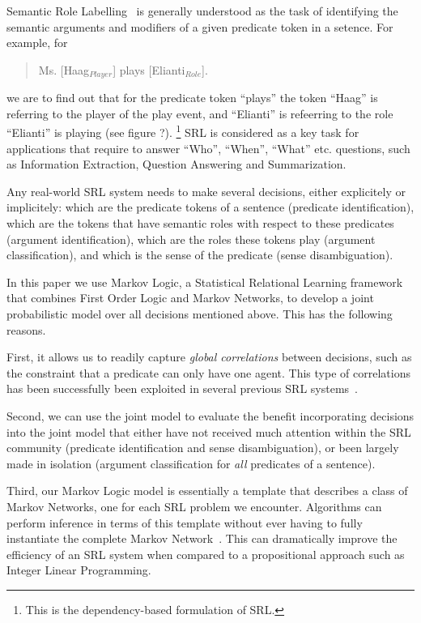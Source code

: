 
Semantic Role Labelling~\citep[SRL, ][]{carreras05introduction}
is generally understood as the task of identifying the semantic arguments
and modifiers of a given predicate token in a setence. For example,
for
\begin{quote}
Ms. {[}Haag$_{Player}$] plays {[}Elianti$_{Role}$].
\end{quote}
we are to find out that for the predicate token {}``plays'' the
token {}``Haag'' is referring to the player of the play event, and
{}``Elianti'' is refeerring to the role {}``Elianti'' is playing
(see figure ?).%
\footnote{This is the dependency-based formulation of SRL.%
} SRL is considered as a key task for applications that require to
answer {}``Who'', {}``When'', {}``What'' etc. questions, such
as Information Extraction, Question Answering and Summarization. 

Any real-world SRL system needs to make several decisions, either
explicitely or implicitely: which are the predicate tokens of a sentence
(predicate identification), which are the tokens that have semantic
roles with respect to these predicates (argument identification),
which are the roles these tokens play (argument classification), and
which is the sense of the predicate (sense disambiguation).

In this paper we use Markov Logic, a Statistical Relational Learning
framework that combines First Order Logic and Markov Networks, to
develop a joint probabilistic model over all decisions mentioned above.
This has the following reasons. %

First, it allows us to readily capture \emph{global correlations}
between decisions, such as the constraint that a predicate can only
have one agent. This type of correlations has been successfully been
exploited in several previous SRL systems~\citep{toutanova05joint,punyakanok05generalized}. 

Second, we can use the joint model to evaluate the benefit incorporating
decisions into the joint model that either have not received much
attention within the SRL community (predicate identification and sense
disambiguation), or been largely made in isolation (argument classification
for \emph{all} predicates of a sentence). 

Third, our Markov Logic model is essentially a template that describes
a class of Markov Networks, one for each SRL problem we encounter.
Algorithms can perform inference in terms of this template without
ever having to fully instantiate the complete Markov
Network~\citep{riedel08improving}. This can dramatically improve the efficiency of an SRL system when
compared to a propositional approach such as Integer Linear Programming.

